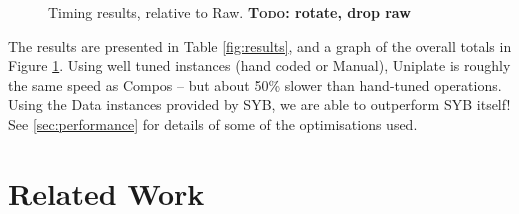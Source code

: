 \documentclass[preprint]{sigplanconf}
\newcommand{\todo}[1]{\textbf{\textsc{Todo:} #1}}
\begin{document}
\begin{figure}
\caption{Timing results, relative to Raw. \todo{rotate, drop raw}}
\label{fig:graph}
\end{figure}


The results are presented in Table \ref{fig:results}, and a graph of the overall totals in Figure \ref{fig:graph}. Using well tuned instances (hand coded or Manual), Uniplate is roughly the same speed as Compos -- but about 50\% slower than hand-tuned operations. Using the Data instances provided by SYB, we are able to outperform SYB itself! See \ref{sec:performance} for details of some of the optimisations used.


\section{Related Work}
\label{sec:related}
\end{document}
